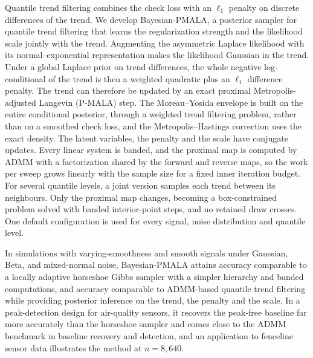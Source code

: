 Quantile trend filtering combines the check loss with an $\ell_1$ penalty on discrete differences of the trend. We develop Bayesian-PMALA, a posterior sampler for quantile trend filtering that learns the regularization strength and the likelihood scale jointly with the trend. Augmenting the asymmetric Laplace likelihood with its normal--exponential representation makes the likelihood Gaussian in the trend. Under a global Laplace prior on trend differences, the whole negative log-conditional of the trend is then a weighted quadratic plus an $\ell_1$ difference penalty. The trend can therefore be updated by an exact proximal Metropolis-adjusted Langevin (P-MALA) step. The Moreau--Yosida envelope is built on the entire conditional posterior, through a weighted trend filtering problem, rather than on a smoothed check loss, and the Metropolis--Hastings correction uses the exact density. The latent variables, the penalty and the scale have conjugate updates. Every linear system is banded, and the proximal map is computed by ADMM with a factorization shared by the forward and reverse maps, so the work per sweep grows linearly with the sample size for a fixed inner iteration budget. For several quantile levels, a joint version samples each trend between its neighbours. Only the proximal map changes, becoming a box-constrained problem solved with banded interior-point steps, and no retained draw crosses. One default configuration is used for every signal, noise distribution and quantile level.

In simulations with varying-smoothness and smooth signals under Gaussian, Beta, and mixed-normal noise, Bayesian-PMALA attains accuracy comparable to a locally adaptive horseshoe Gibbs sampler with a simpler hierarchy and banded computations, and accuracy comparable to ADMM-based quantile trend filtering while providing posterior inference on the trend, the penalty and the scale. In a peak-detection design for air-quality sensors, it recovers the peak-free baseline far more accurately than the horseshoe sampler and comes close to the ADMM benchmark in baseline recovery and detection, and an application to fenceline sensor data illustrates the method at $n = 8{,}640$.

